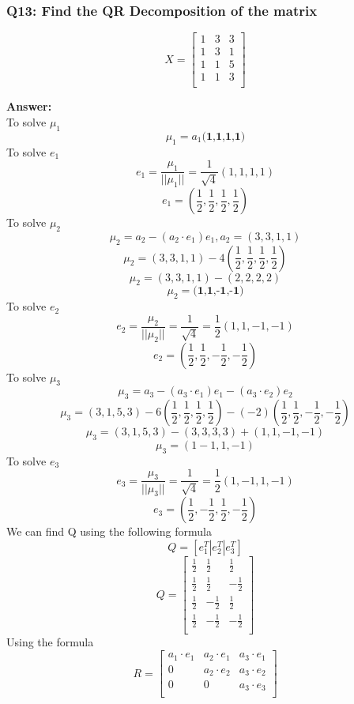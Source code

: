\documentclass{article}
\begin{document}
\subsubsection*{Q13: Find the QR Decomposition of the matrix}

\[
  X=
  \left[ {\begin{array}{ccc}
   1 & 3 & 3\\
   1 & 3 & 1\\
   1 & 1 & 5\\
   1 & 1 & 3\\
  \end{array} } \right]
\]

\textbf{Answer:}\\
To solve $\mu_{1}$
\[
\mu_{1} = a_{1} \textbf{(1,1,1,1)}
\]
To solve $e_{1}$
\[
e_{1} = \frac{\mu_{1}}{||\mu_{1}||} = \frac{1}{\sqrt{4}} (1,1,1,1) 
\]
\[
e_{1}= (\frac{1}{2}, \frac{1}{2}, \frac{1}{2}, \frac{1}{2})
\]
To solve $\mu_{2}$
\[
\mu_2 = a_2 - (a_2 \cdot e_1)e_1, a_2 = (3,3,1,1)
\]
\[
\mu_2 = (3,3,1,1) - 4(\frac{1}{2}, \frac{1}{2}, \frac{1}{2}, \frac{1}{2})
\]
\[
\mu_2 = (3,3,1,1) - (2,2,2,2)
\]
\[
\mu_2 = \textbf{(1,1,-1,-1)}
\]
To solve $e_{2}$
\[
e_2 = \frac{\mu_2}{||\mu_2||} = \frac{1}{\sqrt{4}} = \frac{1}{2}(1,1,-1,-1)
\]
\[
e_2 = (\frac{1}{2}, \frac{1}{2}, -\frac{1}{2},- \frac{1}{2})
\]
To solve $\mu_{3}$
\[
\mu_3 = a_3 - (a_3 \cdot e_1)e_1 - (a_3 \cdot e_2)e_2
\]
\[
\mu_3 = (3,1,5,3) - 6(\frac{1}{2},\frac{1}{2},\frac{1}{2},\frac{1}{2}) - (-2)(\frac{1}{2}, \frac{1}{2}, -\frac{1}{2},- \frac{1}{2})
\]
\[
\mu_3 = (3,1,5,3) - (3,3,3,3) + (1,1,-1,-1)
\]
\[
\mu_3 = (1 -1, 1, -1)
\]
To solve $e_{3}$
\[
e_3 = \frac{\mu_3}{||\mu_3||} = \frac{1}{\sqrt{4}} = \frac{1}{2}(1, -1, 1, -1)
\]
\[
e_3 = (\frac{1}{2}, - \frac{1}{2}, \frac{1}{2}, -\frac{1}{2})
\]
We can find Q using the following formula
\[
Q=[e_1^T | e_2^T | e_3^T]
\]
\[
  Q=
  \left[ {\begin{array}{ccc}
   \frac{1}{2} & \frac{1}{2} & \frac{1}{2}\\
   \frac{1}{2} & \frac{1}{2} & -\frac{1}{2}\\
   \frac{1}{2} & -\frac{1}{2} & \frac{1}{2}\\
   \frac{1}{2} & -\frac{1}{2} & -\frac{1}{2}\\
  \end{array} } \right]
\]
Using the formula 
\[
  R=
  \left[ {\begin{array}{ccc}
   a_1 \cdot e_1 & a_2 \cdot e_1 & a_3 \cdot e_1\\
   0 & a_2 \cdot e_2 & a_3 \cdot e_2\\
   0 & 0 & a_3 \cdot e_3\\
  \end{array} } \right]
\]
\end{document}
